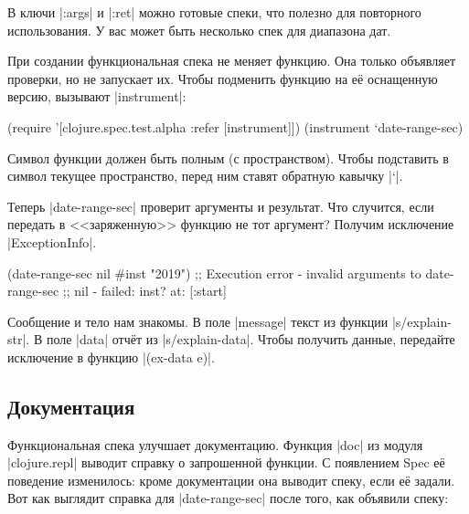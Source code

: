 В ключи \spverb|:args| и \spverb|:ret| можно готовые спеки, что полезно для
повторного использования. У вас может быть несколько спек для диапазона дат.

При создании функциональная спека не меняет функцию. Она только объявляет
проверки, но не запускает их. Чтобы подменить функцию на е\"{е} оснащенную версию,
вызывают \spverb|instrument|:

\begin{english}
  \begin{clojure}
(require '[clojure.spec.test.alpha :refer [instrument]])
(instrument `date-range-sec)
  \end{clojure}
\end{english}

Символ функции должен быть полным (с пространством). Чтобы подставить в символ
текущее пространство, перед ним ставят обратную кавычку \spverb|`|.

Теперь \spverb|date-range-sec| проверит аргументы и результат. Что случится,
если передать в <<заряженную>> функцию не тот аргумент? Получим исключение
\spverb|ExceptionInfo|.

\begin{english}
  \begin{clojure}
(date-range-sec nil #inst "2019")
;; Execution error - invalid arguments to date-range-sec
;; nil - failed: inst? at: [:start]
  \end{clojure}
\end{english}


Сообщение и тело нам знакомы. В поле \spverb|message| текст из функции
\spverb|s/explain-str|. В поле \spverb|data| отч\"{е}т из
\spverb|s/explain-data|. Чтобы получить данные, передайте исключение в функцию
\spverb|(ex-data e)|.

\subsection{Документация}


Функциональная спека улучшает документацию. Функция \spverb|doc| из модуля
\spverb|clojure.repl| выводит справку о запрошенной функции. С появлением Spec
е\"{е} поведение изменилось: кроме документации она выводит спеку, если е\"{е}
задали. Вот как выглядит справка для \spverb|date-range-sec| после того, как
объявили спеку:

